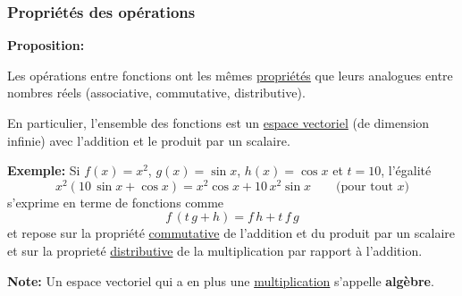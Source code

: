 \begin{frame}[plain]
\frametitle{\bf Propri\'et\'es des op\'erations}
\medskip 

{\bf Proposition:}
\begin{itemize}
\bitem
Les op\'erations entre fonctions ont les m\^emes \underline{propri\'et\'es} 
que leurs analogues entre nombres r\'eels {\small (associative, commutative, 
distributive)}. 

\bitem
En particulier, l'ensemble des fonctions est un \underline{espace vectoriel} 
(de dimension infinie) avec l'addition et le produit par un scalaire. 
\end{itemize}
\vspace*{2mm}

\pause
{\small 
{\bf Exemple:}
Si $f(x)=x^2$, $g(x)=\sin x$, $h(x)=\cos x$ et $t=10$, l'\'egalit\'e
$$
x^2(10\,\sin x+\cos x) = x^2\cos x+10\,x^2\sin x \qquad\mbox{(pour tout $x$)}
$$
s'exprime en terme de fonctions comme 
$$
f\,(t\,g+h) = f\,h + t\,f\,g
$$ 
et repose sur la propri\'et\'e \underline{commutative} de l'addition et du 
produit par un scalaire et sur la propriet\'e \underline{distributive} 
de la multiplication par rapport \`a l'addition.}
\vspace*{3mm}

\pause
{\bf Note:} Un espace vectoriel qui a en plus une \underline{multiplication} 
s'appelle {\bf alg\`ebre}.

\end{frame}


